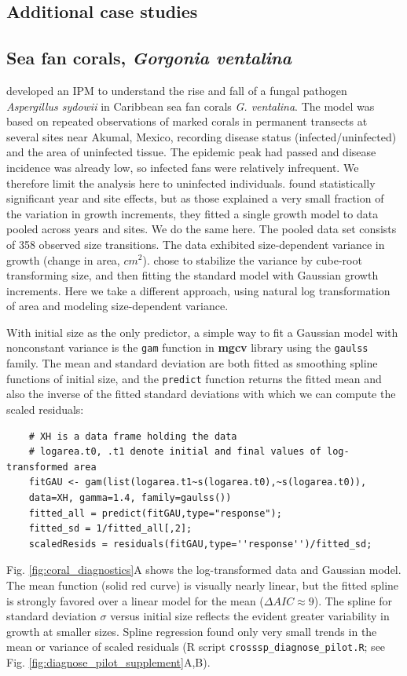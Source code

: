 \documentclass[12pt]{article}
\begin{document}
\begin{spacing}{1.35}
\section{Additional case studies}
\label{sec:moreCases}

\subsection{Sea fan corals, \emph{Gorgonia ventalina}}
\label{sec:seafans}
\cite{bruno-etal-2011} developed an IPM to understand the rise and fall of a fungal pathogen \emph{Aspergillus sydowii} in Caribbean sea fan corals \emph{G. ventalina}. 
The model was based on repeated observations of marked corals in permanent transects at several sites near Akumal, Mexico, recording disease status (infected/uninfected) and the area of uninfected tissue. 
The epidemic peak had passed and disease incidence was already low, so infected fans were relatively infrequent. 
We therefore limit the analysis here to uninfected individuals.
\citet{bruno-etal-2011} found statistically significant year and site effects, but as those explained a very small fraction of the variation in growth increments, they fitted a single growth model to data pooled across years and sites. 
We do the same here. 
The pooled data set consists of 358 observed size transitions. 
The data exhibited size-dependent variance in growth (change in area, $cm^2$).  
\cite{bruno-etal-2011} chose to stabilize the variance by cube-root transforming size, and then fitting the standard model with Gaussian growth increments. 
Here we take a different approach, using natural log transformation of area and modeling size-dependent variance. 

With initial size as the only predictor, a simple way to fit a Gaussian model with nonconstant variance is the \texttt{gam} function in \textbf{mgcv} library \citep{wood-2017} using the \texttt{gaulss} family. 
The mean and standard deviation are both fitted as smoothing spline functions of initial size, and the \texttt{predict} function returns the fitted mean and also the inverse of the fitted standard deviations with which we can compute the scaled residuals: 
\begin{lstlisting}
	# XH is a data frame holding the data
	# logarea.t0, .t1 denote initial and final values of log-transformed area   
	fitGAU <- gam(list(logarea.t1~s(logarea.t0),~s(logarea.t0)),
	data=XH, gamma=1.4, family=gaulss())
	fitted_all = predict(fitGAU,type="response"); 
	fitted_sd = 1/fitted_all[,2]; 
	scaledResids = residuals(fitGAU,type=''response'')/fitted_sd;  
\end{lstlisting}
Fig. \ref{fig:coral_diagnostics}A shows the log-transformed data and Gaussian model. 
The mean function (solid red curve) is visually nearly linear, but the fitted spline is strongly favored over a linear model for the mean ($\Delta AIC \approx 9$). 
The spline for standard deviation $\sigma$ versus initial size reflects the evident greater variability in growth at smaller sizes.  
Spline regression found only very small trends in the mean or variance of scaled residuals (R script \texttt{crosssp\_diagnose\_pilot.R}; see Fig. \ref{fig:diagnose_pilot_supplement}A,B). 


\end{spacing}
\end{document}

